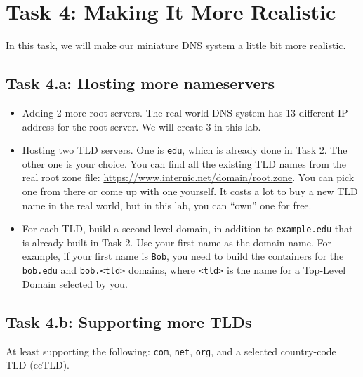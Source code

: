 \section{Task 4: Making It More Realistic}


In this task, we will make our miniature DNS system
a little bit more realistic. 

\subsection{Task 4.a: Hosting more nameservers}


\begin{itemize}
\item Adding 2 more root servers. The real-world DNS system has 13 different 
IP address for the root server. We will create 3 in this lab.

\item Hosting two TLD servers. One is \texttt{edu}, which is already 
done in Task 2. The other one is your choice. 
You can find all the existing TLD names from the 
real root zone file: \url{https://www.internic.net/domain/root.zone}.
You can pick one from there or come up with one yourself. 
It costs a lot to buy a new TLD name in the real world, but in this lab, you 
can ``own'' one for free. 

\item For each TLD, build a second-level domain, in
addition to \texttt{example.edu} that is already built in Task 2. 
Use your first name as the domain name. 
For example, if your first name is \texttt{Bob}, you need to build the containers 
for the \texttt{bob.edu} and \texttt{bob.<tld>} domains,
where \texttt{<tld>} is the name for a Top-Level Domain selected
by you. 
\end{itemize}
 




\subsection{Task 4.b: Supporting more TLDs}


At least supporting the following: 
\texttt{com}, \texttt{net}, \texttt{org}, and 
a selected country-code TLD (ccTLD).

